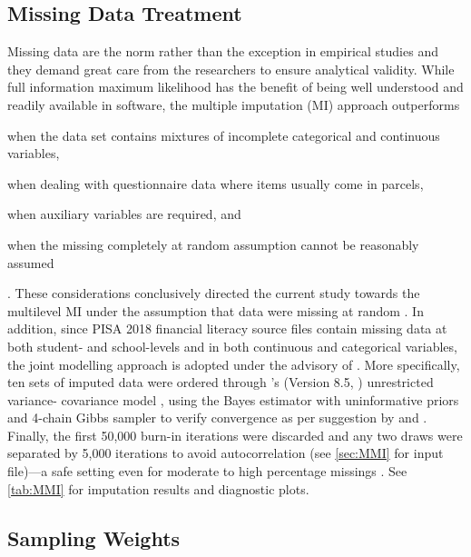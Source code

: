 %

\subsection{Missing Data Treatment}

Missing data are the norm rather than the exception in empirical studies and they demand great care from the researchers to ensure analytical validity. While full information maximum likelihood has the benefit of being well understood and readily available in software, the multiple imputation (MI) approach outperforms
\begin{enumerate*}[label={(\alph*)}]
    \item when the data set contains mixtures of incomplete categorical and continuous variables,
    \item when dealing with questionnaire data where items usually come in parcels,
    \item when auxiliary variables are required, and
    \item when the missing completely at random assumption cannot be reasonably assumed
\end{enumerate*}
\citep{enders:2018}. These considerations conclusively directed the current study towards the multilevel MI under the assumption that data were missing at random \citep{little:2019}. In addition, since PISA 2018 financial literacy source files contain missing data at both student- and school-levels and in both continuous and categorical variables, the joint modelling approach is adopted under the advisory of \citet{grund:2018}. More specifically, ten sets of imputed data were ordered through \CM's (Version 8.5, \citet{mplus}) unrestricted variance- covariance model \citep[``JM-AM H1'',][]{asparouhov:2010b}, using the Bayes estimator with uninformative priors and 4-chain Gibbs sampler to verify convergence as per suggestion by \citet[][p. 230]{little:2019} and \citet[][p. 314]{lambert:2018}. Finally, the first 50,000 burn-in iterations were discarded and any two draws were separated by 5,000 iterations to avoid autocorrelation (see \cref{sec:MMI} for input file)---a safe setting even for moderate to high percentage missings \citep{grund:2016}. See \cref{tab:MMI} for imputation results and diagnostic plots.

\subsection{Sampling Weights}


